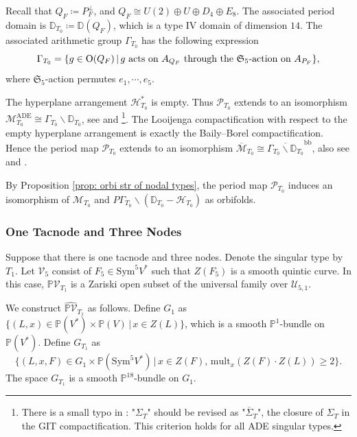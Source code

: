 \documentclass[
]{article}
\begin{document}
Recall that \(Q_F\coloneqq P_F^\perp\), and
\(Q_F\cong U(2)\oplus U\oplus D_4\oplus E_8\). The associated period
domain is \(\mathbb{D}_{T_0}\coloneqq\mathbb{D}(Q_F)\), which is a type
IV domain of dimension \(14\). The associated arithmetic group
\(\Gamma_{T_0}\) has the following expression
\[\Gamma_{T_0} = \{ g\in\mathrm{O}(Q_F) \,|\, g \textup{ acts on } A_{Q_F} \textup{ through the } \mathfrak{S}_5\textup{-action on } A_{P_F}  \},\]
where \(\mathfrak{S}_5\)-action permutes \(e_1,\cdots,e_5\).

The hyperplane arrangement \(\mathcal{H}_{T_0}^*\) is empty. Thus
\(\mathscr{P}_{T_0}\) extends to an isomorphism
\(\mathcal{M}_{T_0}^{\mathrm{ADE}}\cong \Gamma_{T_0}\backslash\mathbb{D}_{T_0}\),
see \cite[Theorem 4.1]{laza2009deformations} and
\cite[Proposition 3.7]{yu2023moduli}\footnote{There is a small typo in
  \cite[Proposition 3.7]{yu2023moduli}: "\(\Sigma_T\)" should be revised
  as "\(\overline{\Sigma}_T\)", the closure of \(\Sigma_T\) in the GIT
  compactification. This criterion holds for all ADE singular types.}.
The Looijenga compactification with respect to the empty hyperplane
arrangement is exactly the Baily--Borel compactification. Hence the
period map \(\mathscr{P}_{T_0}\) extends to an isomorphism
\(\overline{\mathcal{M}}_{T_0}\cong \overline{\Gamma_{T_0}\backslash\mathbb{D}_{T_0}}^{\mathrm{bb}}\),
also see \cite[Theorem 4.2]{laza2009deformations} and
\cite[Proposition 4.3]{yu2023moduli}.

By Proposition \ref{prop: orbi str of nodal types}, the period map
\(\mathscr{P}_{T_0}\) induces an isomorphism of \(\mathcal{M}_{T_0}\)
and \(P\Gamma_{T_0}\backslash(\mathbb{D}_{T_0}-\mathcal{H}_{T_0})\) as
orbifolds.

\subsubsection{One Tacnode and Three
Nodes}\label{one-tacnode-and-three-nodes}

Suppose that there is one tacnode and three nodes. Denote the singular
type by \(T_1\). Let \(\mathcal{V}_{5}\) consist of
\(F_5\in\mathrm{Sym}^5 V^*\) such that \(Z(F_5)\) is a smooth quintic
curve. In this case, \(\mathbb{P}\mathcal{V}_{T_1}\) is a Zariski open
subset of the universal family over \(\mathcal{U}_{5,1}\).

We construct \(\widehat{\mathbb{P}\mathcal{V}}_{T_1}\) as follows.
Define \(G_1\) as \(\{ 
(L,x)\in\mathbb{P}(V^*)\times\mathbb{P}(V) \,|\, x\in Z(L) \}\), which
is a smooth \(\mathbb{P}^1\)-bundle on \(\mathbb{P}(V^*)\). Define
\(G_{T_1}\) as
\[\{ (L,x,F)\in G_1\times\mathbb{P}(\mathrm{Sym}^5 V^*) \,|\, x\in Z(F),\, \mathrm{mult}_x(Z(F)\cdot Z(L))\ge 2 \}.\]
The space \(G_{T_1}\) is a smooth \(\mathbb{P}^{18}\)-bundle on \(G_1\).
\end{document}
